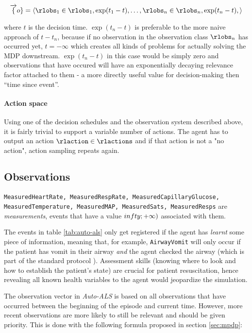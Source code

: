 \begin{equation} \overrightarrow\{o\} =
\langle \rlobs_1 \in \rlobs_1,
\exp(t_1-t), \dots, \rlobs_n \in
\rlobs_n, \exp(t_n-t), \rangle
\end{equation}

where $t$ is the decision time.
$\exp(t_n-t)$ is preferable
to the more naive approach of $t-t_n$,
because if no observation in the observation class
$\rlobs_n$ has occurred yet,
$t=-\infty$ which creates all
kinds of problems for actually solving the MDP downstream.
$\exp(t_n-t)$ in this case
would be simply zero and observations that have occured will have an
exponentially decaying relevance factor attached to them - a more
directly useful value for decision-making then ``time since event''.

\paragraph{Action space}

Using one of the decision schedules and the observation system described above, it is fairly trivial to support a variable number of actions. 
The agent has to output an action $\rlaction \in \rlactions$ and if that action is not a "no action", action sampling repeats again.

\newpage
\subsection{Observations}
\label{sec:auto-als-obs}

\texttt{MeasuredHeartRate, MeasuredRespRate, MeasuredCapillaryGlucose, MeasuredTemperature, MeasuredMAP, MeasuredSats, MeasuredResps} are \emph{measurements}, events that have a value $\-infty; +\infty)$ associated with them.

    
The events in table \ref{tab:auto-als} only get registered if the agent has \emph{learnt} some piece of information, meaning that, for example, \verb|AirwayVomit| will only occur if the patient has vomit in their airway \emph{and} the agent checked the airway (which is part of the standard protocol \cite{abcde}).
Assessment skills (knowing where to look and how to establish the patient's state) are crucial for patient resuscitation, hence revealing all known health variables to the agent would jeopardize the simulation.

The observation vector in \emph{Auto-ALS} is based on all observations that have occurred between the beginning of the episode and current time.
However, more recent observations are more likely to still be relevant and should be given priority.
This is done with the following formula proposed in section \ref{sec:mpdp}:

